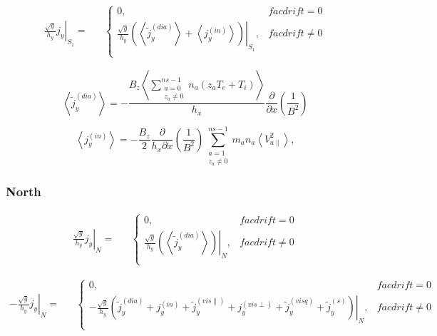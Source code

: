 \documentclass[a4paper,10pt]{report}
\begin{document}
\begin{equation*}
\begin{matrix}
\left. \frac{\sqrt{g}}{h_y} j_y \right|_{S_1} = &
& \left\{
\begin{matrix}
0, & facdrift = 0 \\
\left. \frac{\sqrt{g}}{h_y}
\left(
	\left\langle \widetilde j_y^{(dia)} \right\rangle +
	\left\langle j_y^{(in)} \right\rangle
\right) \right|_{S_1}
, & facdrift \neq 0 \\
\end{matrix} \right.
\end{matrix}
\end{equation*}

\begin{equation*}
\left\langle \widetilde j_y^{(dia)} \right\rangle =
- \frac{
	B_z \left\langle
		\sum \limits^{ns-1}_{\substack{a = 0 \\
                        z_a \neq 0}} n_a \left(
			z_a T_e + T_i
		\right)
	\right\rangle
}{h_x}
\frac{\partial}{\partial x}
\left( \frac{1}{B^2} \right)
\end{equation*}

\begin{equation*}
\left\langle j_y^{(in)} \right\rangle =
- \frac{B_z}{2}
\frac{\partial}{h_x \partial x}
\left( \frac{1}{B^2} \right)
\sum \limits^{ns-1}_{\substack{a = 1 \\
    z_a \neq 0}} m_a n_a \left\langle V^2_{a \parallel}
\right\rangle,
\end{equation*}

\subsubsection{North}

\begin{equation*}
\begin{matrix}
\left. \frac{\sqrt{g}}{h_y} j_y \right|_N = &
& \left\{
\begin{matrix}
0, & facdrift = 0 \\
\left. \frac{\sqrt{g}}{h_y}
\left(
	\left\langle \widetilde j_y^{(dia)} \right\rangle
\right) \right|_N
, & facdrift \neq 0 \\
\end{matrix} \right.
\end{matrix}
\end{equation*}


\begin{equation*}
\begin{matrix}
\left. - \frac{\sqrt{g}}{h_y} j_y \right|_N = &
& \left\{
\begin{matrix}
0, & facdrift = 0 \\
\left. - \frac{\sqrt{g}}{h_y}
\left(
	\widetilde j_y^{(dia)} + j_y^{(in)} +
        \widetilde j_y^{(vis \parallel)} + j_y^{(vis \perp)} +
	\widetilde j_y^{(visq)} + \widetilde j_y^{(s)}
\right) \right|_N
, & facdrift \neq 0 \\
\end{matrix} \right.
\end{matrix}
\end{equation*}
\end{document}
